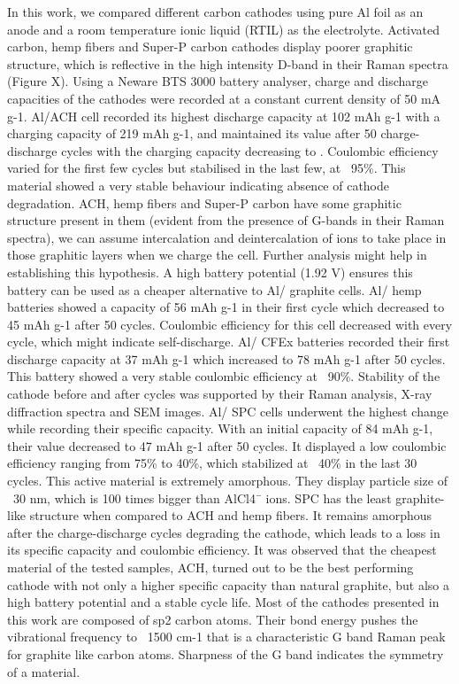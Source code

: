 \documentclass{article}
\begin{document}
In this work, we compared different carbon cathodes using pure Al foil as an anode and a room temperature ionic liquid (RTIL) as the electrolyte. Activated carbon, hemp fibers and Super-P carbon cathodes display poorer graphitic structure, which is reflective in the high intensity D-band in their Raman spectra (Figure X). Using a Neware BTS 3000 battery analyser, charge and discharge capacities of the cathodes were recorded at a constant current density of 50 mA g-1. Al/ACH cell recorded its highest discharge capacity at 102 mAh g-1 with a charging capacity of 219 mAh g-1, and maintained its value after 50 charge-discharge cycles with the charging capacity decreasing to . Coulombic efficiency varied for the first few cycles but stabilised in the last few, at ~95\%. This material showed a very stable behaviour indicating absence of cathode degradation. ACH, hemp fibers and Super-P carbon have some graphitic structure present in them (evident from the presence of G-bands in their Raman spectra), we can assume intercalation and deintercalation of ions to take place in those graphitic layers when we charge the cell. Further analysis might help in establishing this hypothesis. A high battery potential (1.92 V) ensures this battery can be used as a cheaper alternative to Al/ graphite cells.  Al/ hemp batteries showed a capacity of 56 mAh g-1 in their first cycle which decreased to 45 mAh g-1 after 50 cycles. Coulombic efficiency for this cell decreased with every cycle, which might indicate self-discharge. Al/ CFEx batteries recorded their first discharge capacity at 37 mAh g-1 which increased to 78 mAh g-1 after 50 cycles. This battery showed a very stable coulombic efficiency at ~90\%. Stability of the cathode before and after cycles was supported by their Raman analysis, X-ray diffraction spectra and SEM images. Al/ SPC cells underwent the highest change while recording their specific capacity. With an initial capacity of 84 mAh g-1, their value decreased to 47 mAh g-1 after 50 cycles.  It displayed a low coulombic efficiency ranging from 75\% to 40\%, which stabilized at ~40\% in the last 30 cycles. This active material is extremely amorphous. They display particle size of ~30 nm, which is 100 times bigger than AlCl4¯ ions. SPC has the least graphite-like structure when compared to ACH and hemp fibers. It remains amorphous after the charge-discharge cycles degrading the cathode, which leads to a loss in its specific capacity and coulombic efficiency. It was observed that the cheapest material of the tested samples, ACH, turned out to be the best performing cathode with not only a higher specific capacity than natural graphite, but also a high battery potential and a stable cycle life. Most of the cathodes presented in this work are composed of sp2 carbon atoms. Their bond energy pushes the vibrational frequency to ~1500 cm-1 that is a characteristic G band Raman peak for graphite like carbon atoms. Sharpness of the G band indicates the symmetry of a material. 
\end{document}
